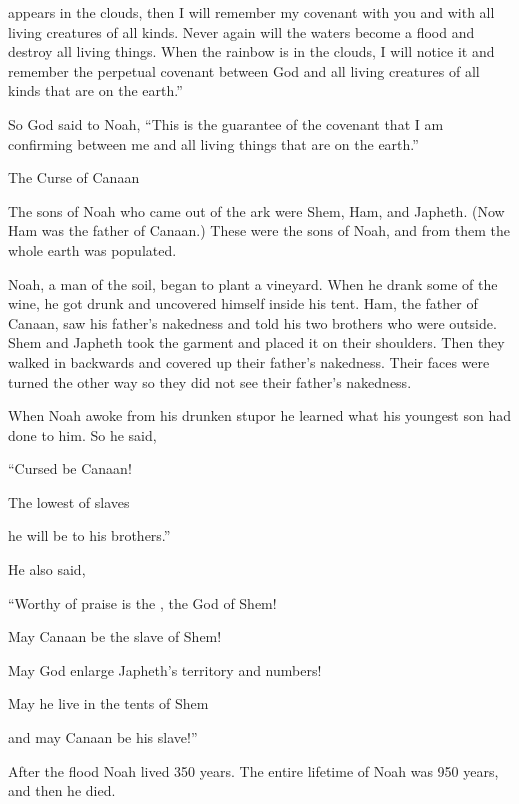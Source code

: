 {appears
in the clouds,
then I will remember
my covenant
with you and with all
living
creatures
of all
kinds.
Never
again
will the waters
become a flood
and destroy
all
living things.
When
the rainbow
is in the clouds,
I
will notice
it and remember
the perpetual
covenant
between
God
and all
living
creatures
of all
kinds
that
are on
the earth.”
\par }{\PP {}So God
said
to
Noah,
“This
is the guarantee
of the covenant
that
I am
confirming
between
me and all
living
things that
are on
the earth.”
\par }{\SH The Curse of Canaan
\par }{\PP {}The sons
of Noah
who came out
of the ark
were Shem,
Ham,
and Japheth.
(Now Ham
was
the father
of Canaan.)
These
were the sons
of Noah,
and from them the whole
earth
was populated.
\par }{\PP {}Noah,
a man
of the soil,
began
to plant
a vineyard.
When he drank
some
of the wine,
he got drunk
and uncovered
himself inside
his tent.
Ham,
the father
of Canaan,
saw
his father’s
nakedness
and told
his two
brothers
who were outside.
Shem
and Japheth
took
the garment
and placed
it on
their shoulders.
Then
they walked
in backwards
and covered
up their father’s
nakedness.
Their faces
were turned the other way
so they did not
see
their father’s
nakedness.
\par }{\PP {}When Noah
awoke
from his drunken stupor
he learned what
his youngest
son
had
done to him.
So he said,
\par }{\Q “Cursed
be Canaan!

\par }{\Q The lowest of
slaves
\par }{\Q he will be
to his brothers.”
\par }{\PP {}He also said,
\par }{\Q “Worthy
of praise is the
{}, the God
of Shem!
\par }{\Q May Canaan
be
the slave of Shem!
\par }{\Q {}May God
enlarge
Japheth’s
territory and numbers!

\par }{\Q May he live
in the tents
of Shem
\par }{\Q and may Canaan
be his slave!”
\par }{\PP {}After
the flood
Noah
lived
350
years.
The entire
lifetime
of Noah
was 950
years,
and then he died.

}
